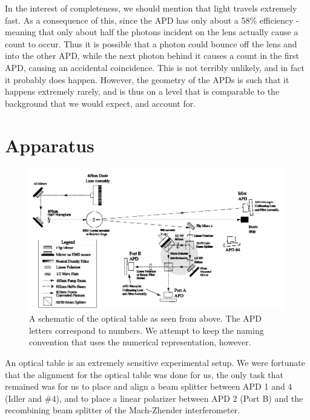 \documentclass{article}
\begin{document}
	\hspace{.5cm}

	In the interest of completeness, we should mention that light travels extremely fast.  As a consequence of this, since the APD has only about a 58\% efficiency \cite{eff} - meaning that only about half the photons incident on the lens actually cause a count to occur.  Thus it is possible that a photon could bounce off the lens and into the other APD, while the next photon behind it causes a count in the first APD, causing an accidental coincidence.  This is not terribly unlikely, and in fact it probably does happen.  However, the geometry of the APDs is such that it happens extremely rarely, and is thus on a level that is comparable to the background that we would expect, and account for.

\section{Apparatus}

\begin{figure}[!htb]
	\centering
	\includegraphics[scale=.5]{apparatus_setup.png}
	\caption{A schematic of the optical table as seen from above.  The APD letters correspond to numbers.  We attempt to keep the naming convention that uses the numerical representation, however.}
\end{figure}

An optical table is an extremely sensitive experimental setup.  We were fortunate that the alignment for the optical table was done for us, the only task that remained was for us to place and align a beam splitter between APD 1 and 4 (Idler and \#4), and to place a linear polarizer between APD 2 (Port B) and the recombining beam splitter of the Mach-Zhender interferometer.

\hspace{.5cm}
\end{document}
